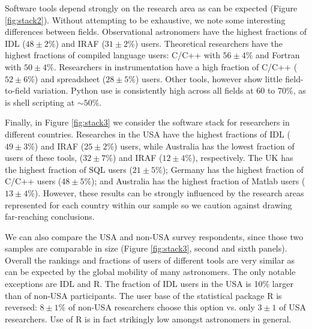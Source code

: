Software tools depend strongly on the research area as can be expected (Figure \ref{fig:stack2}). Without attempting to be exhaustive, we note some interesting differences between fields. Observational astronomers have the highest fractions of IDL ($48\pm2\%$) and IRAF ($31\pm2\%$) users. Theoretical researchers have the highest fractions of compiled language users: C/C++ with $56\pm4\%$ and Fortran with $50\pm4\%$. Researchers in instrumentation have a high fraction of C/C++ ($52\pm6\%$) and spreadsheet ($28\pm5\%$) users. Other tools, however show little field-to-field variation. Python use is consistently high across all fields at 60 to 70\%, as is shell scripting at $\sim50\%$. 

Finally, in Figure \ref{fig:stack3} we consider the software stack for researchers in different countries. Researches in the USA have the highest fractions of IDL ($49\pm3\%$) and IRAF ($25\pm2\%$) users, while Australia has the lowest fraction of users of these tools, ($32\pm7\%$) and IRAF ($12\pm4\%$), respectively. The UK has the highest fraction of SQL users ($21\pm5\%$); Germany has the highest fraction of C/C++ users ($48\pm5\%$); and Australia has the highest fraction of Matlab users ($13\pm4\%$). However, these results can be strongly influenced by the research areas represented for each country within our sample so we caution against drawing far-reaching conclusions. 

We can also compare the USA and non-USA survey respondents, since those two samples are comparable in size (Figure \ref{fig:stack3}, second and sixth panels). Overall the rankings and fractions of users of different tools are very similar as can be expected by the global mobility of many astronomers. The only notable exceptions are IDL and R. The fraction of IDL users in the USA is 10\% larger than of non-USA participants. The user base of the statistical package R is reversed:  $8\pm1\%$ of non-USA researchers choose this option vs. only $3\pm1$ of USA researchers. Use of R is in fact strikingly low amongst astronomers in general.